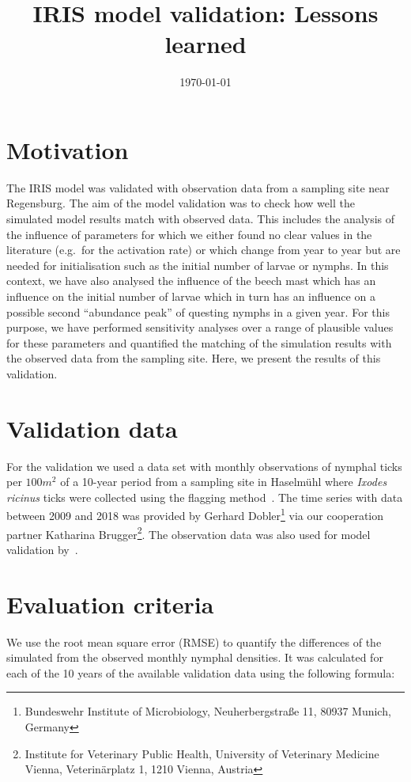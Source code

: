 \documentclass[a4paper, 11pt]{scrartcl}
\title{IRIS model validation: Lessons learned}
\author{}
\date{\today}
\begin{document}
\maketitle
\tableofcontents


\newpage
\section{Motivation}
The IRIS model was validated with observation data from a sampling site near Regensburg. The aim of the model validation was to check how well the simulated model results match
with observed data. This includes the analysis of the influence of parameters for which we either found no clear values in the literature (e.g.\ for the activation rate) or
which change from year to year but are needed for initialisation such as the initial number of larvae or nymphs. In this context, we have also analysed the influence of the
beech mast which has an influence on the initial number of larvae which in turn has an influence on a possible second ``abundance peak'' of questing nymphs in a given year. For
this purpose, we have performed sensitivity analyses over a range of plausible values for these parameters and quantified the matching of the simulation results with the
observed data from the sampling site. Here, we present the results of this validation.


\section{Validation data}
For the validation we used a data set with monthly observations of nymphal ticks per $100 m^2$ of a 10-year period from a sampling site in Haselmühl where
\textit{Ixodes ricinus} ticks were collected using the flagging method~\parencite{Brugger.2017}. The time series with data between 2009 and 2018 was provided by
Gerhard Dobler\footnote{Bundeswehr Institute of Microbiology, Neuherbergstraße 11, 80937 Munich, Germany} via our cooperation partner Katharina
Brugger\footnote{Institute for Veterinary Public Health, University of Veterinary Medicine Vienna, Veterinärplatz 1, 1210 Vienna, Austria}. The observation data was also
used for model validation by~\textcite{Brugger.2017, Brugger.2018}.


\section{Evaluation criteria}
We use the root mean square error (RMSE) to quantify the differences of the simulated from the observed monthly nymphal densities. It was calculated for each of the 10 years of
the available validation data using the following formula:
\end{document}
